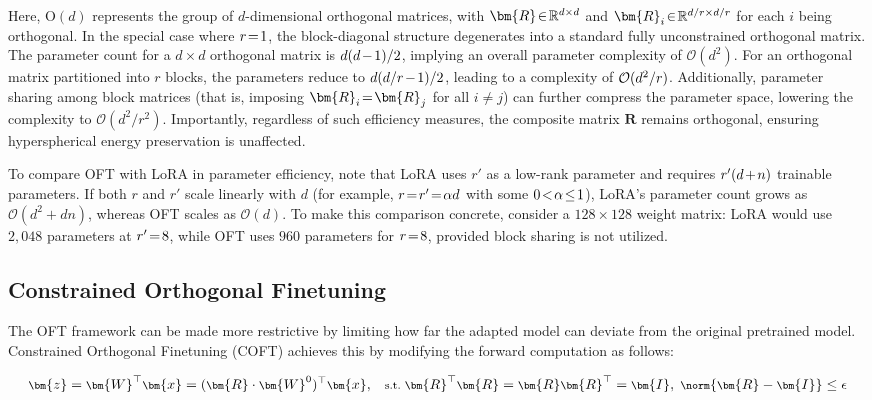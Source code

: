 Here, $\text{O}(d)$ represents the group of $d$-dimensional orthogonal matrices, with $\thickmuskip=2mu \medmuskip=2mu \bm{R}\in\mathbb{R}^{d\times d}$ and $\thickmuskip=2mu \medmuskip=2mu \bm{R}_i\in\mathbb{R}^{d/r\times d/r}$ for each $i$ being orthogonal. In the special case where $\thickmuskip=2mu \medmuskip=2mu r=1$, the block-diagonal structure degenerates into a standard fully unconstrained orthogonal matrix. The parameter count for a $d \times d$ orthogonal matrix is $\thickmuskip=2mu \medmuskip=2mu d(d-1)/2$, implying an overall parameter complexity of $\mathcal{O}(d^2)$. For an orthogonal matrix partitioned into $r$ blocks, the parameters reduce to $\thickmuskip=2mu \medmuskip=2mu d(d/r-1)/2$, leading to a complexity of $\thickmuskip=2mu \medmuskip=2mu \mathcal{O}(d^2/r)$. Additionally, parameter sharing among block matrices (that is, imposing $\thickmuskip=2mu \medmuskip=2mu\bm{R}_i=\bm{R}_j$ for all $i \neq j$) can further compress the parameter space, lowering the complexity to $\mathcal{O}(d^2/r^2)$. Importantly, regardless of such efficiency measures, the composite matrix $\bm{R}$ remains orthogonal, ensuring hyperspherical energy preservation is unaffected.

To compare OFT with LoRA in parameter efficiency, note that LoRA uses $r'$ as a low-rank parameter and requires $\thickmuskip=2mu \medmuskip=2mu r'(d+n)$ trainable parameters. If both $r$ and $r'$ scale linearly with $d$ (for example, $\thickmuskip=2mu \medmuskip=2mu r=r'=\alpha d$ with some $\thickmuskip=2mu \medmuskip=2mu 0<\alpha\leq 1$), LoRA’s parameter count grows as $\mathcal{O}(d^2+dn)$, whereas OFT scales as $\mathcal{O}(d)$. To make this comparison concrete, consider a $128\times 128$ weight matrix: LoRA would use $2,048$ parameters at $\thickmuskip=2mu \medmuskip=2mu r'=8$, while OFT uses $960$ parameters for $\thickmuskip=2mu \medmuskip=2mu r=8$, provided block sharing is not utilized.

\subsection{Constrained Orthogonal Finetuning}

The OFT framework can be made more restrictive by limiting how far the adapted model can deviate from the original pretrained model. Constrained Orthogonal Finetuning (COFT) achieves this by modifying the forward computation as follows:

\begin{equation}\label{eq:coft_general}
    \footnotesize
    \bm{z}=\bm{W}^\top\bm{x}=(\bm{R}\cdot\bm{W}^0)^\top\bm{x},~~~\text{s.t.}~\bm{R}^\top\bm{R}=\bm{R}\bm{R}^\top=\bm{I},~\norm{\bm{R}-\bm{I}}\leq \epsilon
\end{equation}

